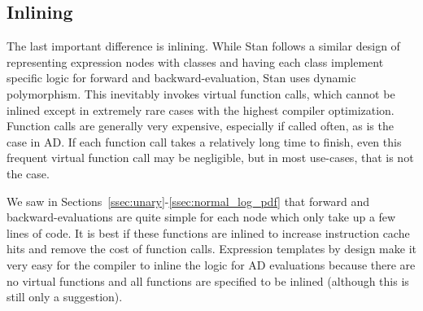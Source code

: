 \subsection{Inlining}

The last important difference is inlining.
While Stan follows a similar design of representing
expression nodes with classes and having each class implement
specific logic for forward and backward-evaluation,
Stan uses dynamic polymorphism.
This inevitably invokes virtual function calls,
which cannot be inlined except in extremely rare cases
with the highest compiler optimization.
Function calls are generally very expensive, especially if called often,
as is the case in AD.
If each function call takes a relatively long time to finish,
even this frequent virtual function call may be negligible,
but in most use-cases, that is not the case.

We saw in Sections~\ref{ssec:unary}-\ref{ssec:normal_log_pdf}
that forward and backward-evaluations are quite simple for each node
which only take up a few lines of code.
It is best if these functions are inlined to increase instruction cache hits
and remove the cost of function calls.
Expression templates by design make it very easy for the compiler to inline
the logic for AD evaluations because there are no virtual functions
and all functions are specified to be inlined (although this is still only a suggestion).
